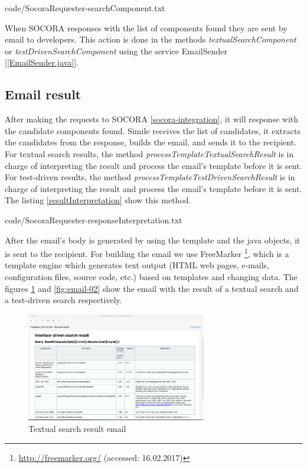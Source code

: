 
{code/SocoraRequester-searchComponent.txt}

When SOCORA responses with the list of components found they are sent by email to developers. This action is done in the methods \emph{textualSearchComponent} or \emph{testDrivenSearchComponent} using the service EmailSender [\ref{EmailSender.java}].

\subsection{Email result}
After making the requests to SOCORA \ref{socora-integration}, it will response with the candidate components found. Simile receives the list of candidates, it extracts the candidates from the response, builds the email, and sends it to the recipient. For textual search results, the method \emph{processTemplateTextualSearchResult} is in charge of interpreting the result and process the email's template before it is sent. For test-driven results, the method \emph{processTemplateTestDrivenSearchResult} is in charge of interpreting the result and process the email's template before it is sent. The listing \ref{resultInterpretation} show this method.


{code/SocoraRequester-responseInterpretation.txt}

After the email's body is generated by using the template and the java objects, it is sent to the recipient. For building the email we use FreeMarker \footnote{\url{http://freemarker.org/} (accessed: 16.02.2017)}, which is a template engine which generates text output (HTML web pages, e-mails, configuration files, source code, etc.) based on templates and changing data. The figures \ref{fig:email-01} and \ref{fig:email-02} show the email with the result of a textual search and a test-driven search respectively.

\begin{figure}[H]
	\centering
    \includegraphics[width=0.7\textwidth]{grafiken/email-01}
    \caption{Textual search result email}
    \label{fig:email-01}
\end{figure}

